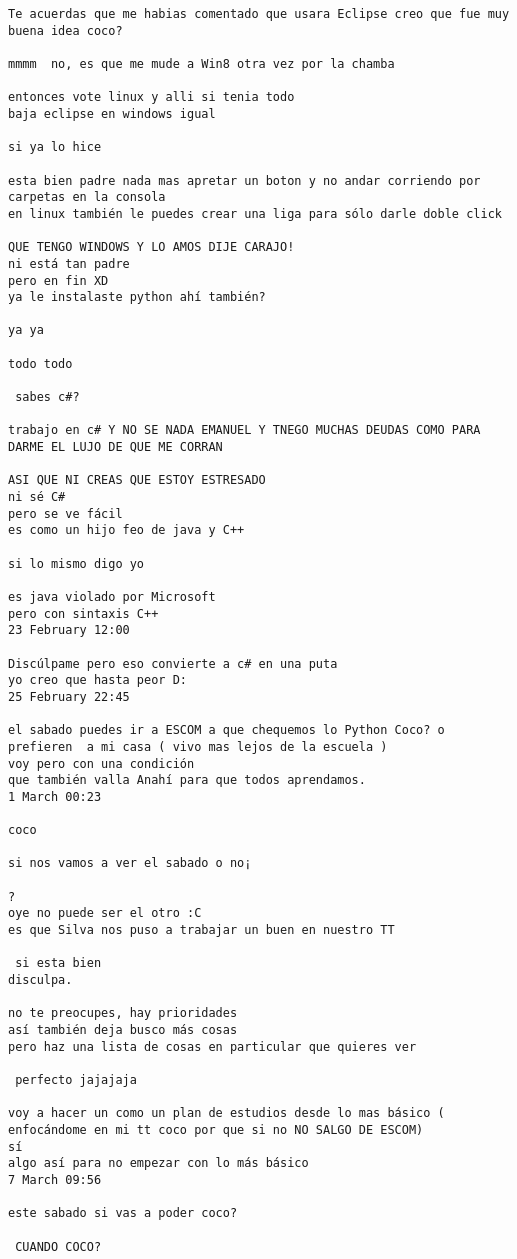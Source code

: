 \begin{verbatim}
Te acuerdas que me habias comentado que usara Eclipse creo que fue muy buena idea coco?

mmmm  no, es que me mude a Win8 otra vez por la chamba

entonces vote linux y alli si tenia todo
baja eclipse en windows igual

si ya lo hice

esta bien padre nada mas apretar un boton y no andar corriendo por carpetas en la consola
en linux también le puedes crear una liga para sólo darle doble click

QUE TENGO WINDOWS Y LO AMOS DIJE CARAJO!
ni está tan padre
pero en fin XD
ya le instalaste python ahí también?

ya ya

todo todo

 sabes c#?

trabajo en c# Y NO SE NADA EMANUEL Y TNEGO MUCHAS DEUDAS COMO PARA DARME EL LUJO DE QUE ME CORRAN

ASI QUE NI CREAS QUE ESTOY ESTRESADO
ni sé C#
pero se ve fácil
es como un hijo feo de java y C++

si lo mismo digo yo

es java violado por Microsoft
pero con sintaxis C++
23 February 12:00

Discúlpame pero eso convierte a c# en una puta
yo creo que hasta peor D:
25 February 22:45

el sabado puedes ir a ESCOM a que chequemos lo Python Coco? o prefieren  a mi casa ( vivo mas lejos de la escuela )
voy pero con una condición 
que también valla Anahí para que todos aprendamos.
1 March 00:23

coco

si nos vamos a ver el sabado o no¡

?
oye no puede ser el otro :C
es que Silva nos puso a trabajar un buen en nuestro TT

 si esta bien
disculpa.

no te preocupes, hay prioridades
así también deja busco más cosas
pero haz una lista de cosas en particular que quieres ver

 perfecto jajajaja

voy a hacer un como un plan de estudios desde lo mas básico ( enfocándome en mi tt coco por que si no NO SALGO DE ESCOM)
sí
algo así para no empezar con lo más básico
7 March 09:56

este sabado si vas a poder coco?

 CUANDO COCO?


\end{verbatim}
